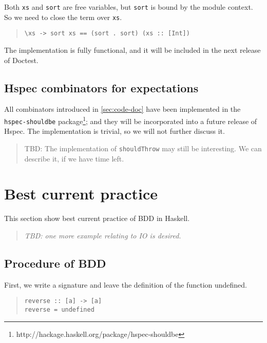 \documentclass[preprint]{sigplanconf}
\begin{document}
\noindent Both \verb|xs| and \verb|sort| are free variables, but
\verb|sort| is bound by the module context.  So we need to close the
term over \verb|xs|.

\begin{quote}\small\begin{verbatim}
\xs -> sort xs == (sort . sort) (xs :: [Int])
\end{verbatim}\end{quote}

The implementation is fully functional, and it will be included in the
next release of Doctest.


\subsection{Hspec combinators for expectations}
\label{sec:hspec-comb}

\noindent All combinators introduced in \ref{sec:code-doc} have been
implemented in the {\tt hspec-shouldbe} package\footnote{%
http://hackage.haskell.org/package/hspec-shouldbe};
and they will be incorporated into a future
release of Hspec.
The implementation is trivial, so we will not further discuss it.

\begin{quote}
    TBD: The implementation of \verb|shouldThrow| may still be
    interesting.  We can describe it, if we have time left.
\end{quote}


\section{Best current practice}
\label{ref:Best-current-practice}

This section show best current practice of
BDD in Haskell.

\begin{quote}
    \emph{TBD: one more example relating to IO is desired.}
\end{quote}

\subsection{Procedure of BDD}

First, we write a signature and leave the definition of the function undefined.

\begin{quote}
\small
\begin{verbatim}
reverse :: [a] -> [a]
reverse = undefined
\end{verbatim}
\end{quote}
\end{document}
